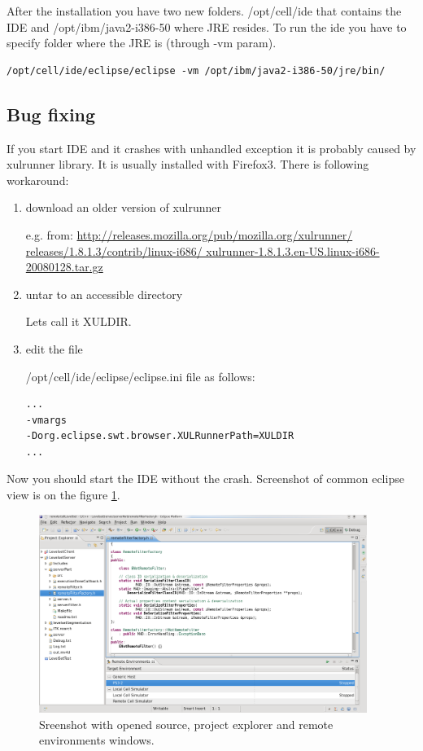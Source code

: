 After the installation you have two new folders.
/opt/cell/ide that contains the IDE and /opt/ibm/java2-i386-50 where JRE resides.
To run the ide you have to specify folder where the JRE is (through -vm param).

\begin{verbatim}
/opt/cell/ide/eclipse/eclipse -vm /opt/ibm/java2-i386-50/jre/bin/
\end{verbatim}

\subsection{Bug fixing}
\label{XULLFIX}

If you start IDE and it crashes with unhandled exception it is probably caused by xulrunner library.
It is usually installed with Firefox3. There is following workaround:
\begin{enumerate}
\item download an older version of xulrunner

e.g. from: \url{http://releases.mozilla.org/pub/mozilla.org/xulrunner/ releases/1.8.1.3/contrib/linux-i686/ xulrunner-1.8.1.3.en-US.linux-i686-20080128.tar.gz}

\item untar to an accessible directory

Lets call it XULDIR.

\item edit the file

/opt/cell/ide/eclipse/eclipse.ini file as follows:
\begin{verbatim}
...
-vmargs
-Dorg.eclipse.swt.browser.XULRunnerPath=XULDIR
...
\end{verbatim}
\end{enumerate}
Now you should start the IDE without the crash.
Screenshot of common eclipse view is on the figure \ref{fg:eclipse}.

\begin{figure}
    \centering
    \includegraphics[width=0.95\textwidth]{data/png/eclipse}
    \caption[Screenshot of standard cellide veiw]{Sreenshot with opened source, project explorer and remote environments windows.}
    \label{fg:eclipse}
\end{figure}

